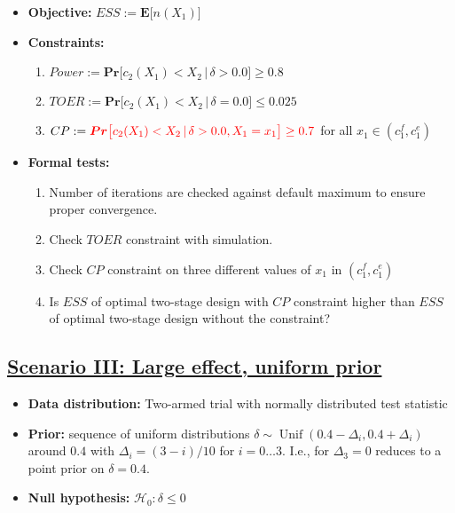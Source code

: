 \documentclass[
]{book}
\providecommand{\tightlist}{%
  \setlength{\itemsep}{0pt}\setlength{\parskip}{0pt}}
\begin{document}
\begin{itemize}
\tightlist
\item
  \textbf{Objective:} \(ESS := \boldsymbol{E}\big[n(X_1)\big]\)
\item
  \textbf{Constraints:}

  \begin{enumerate}
  \def\labelenumi{\arabic{enumi}.}
  \tightlist
  \item
    \(Power := \boldsymbol{Pr}\big[c_2(X_1) < X_2\,|\,\delta>0.0\big] \geq 0.8\)
  \item
    \(TOER := \boldsymbol{Pr}\big[c_2(X_1) < X_2\,|\,\delta=0.0\big] \leq 0.025\)
  \item
    \(CP := \color{red}{\boldsymbol{Pr}\big[c_2(X_1) < X_2\,|\,\delta> 0.0, X_1 = x_1\big] \geq 0.7}\)
    for all \(x_1\in(c_1^f, c_1^e)\)
  \end{enumerate}
\item
  \textbf{Formal tests:}

  \begin{enumerate}
  \def\labelenumi{\arabic{enumi}.}
  \tightlist
  \item
    Number of iterations are checked against default maximum to ensure proper
    convergence.
  \item
    Check \(TOER\) constraint with simulation.
  \item
    Check \(CP\) constraint on three different values of \(x_1\) in
    \((c_1^f, c_1^e)\)
  \item
    Is \(ESS\) of optimal two-stage design with \(CP\) constraint higher than
    \(ESS\) of optimal two-stage design without the constraint?
  \end{enumerate}
\end{itemize}

\hypertarget{scenario-iii-large-effect-uniform-prior}{%
\subsection{\texorpdfstring{\protect\hyperlink{scenarioIII}{Scenario III: Large effect, uniform prior}}{Scenario III: Large effect, uniform prior}}\label{scenario-iii-large-effect-uniform-prior}}

\begin{itemize}
\tightlist
\item
  \textbf{Data distribution:} Two-armed trial with normally distributed test statistic
\item
  \textbf{Prior:} sequence of uniform distributions
  \(\delta\sim\operatorname{Unif}(0.4 - \Delta_i, 0.4 + \Delta_i)\)
  around \(0.4\) with \(\Delta_i=(3 - i)/10\) for \(i=0\ldots 3\).
  I.e., for \(\Delta_3=0\) reduces to a point prior on \(\delta=0.4\).
\item
  \textbf{Null hypothesis:} \(\mathcal{H}_0:\delta \leq 0\)
\end{itemize}
\end{document}
